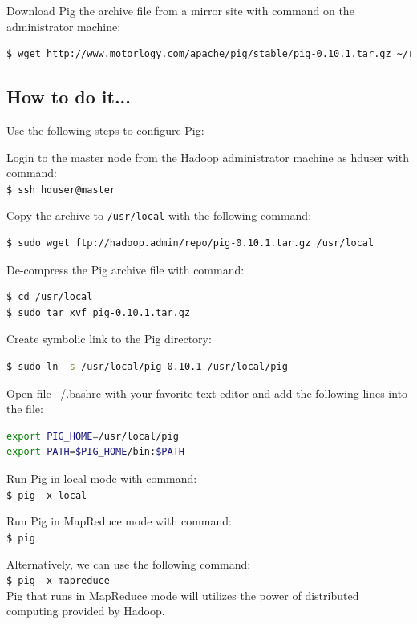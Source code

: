 Download Pig the archive file from a mirror site with command on the administrator machine:
\lstset{style=bashstyle}
\begin{lstlisting}[language=bash]
$ wget http://www.motorlogy.com/apache/pig/stable/pig-0.10.1.tar.gz ~/repo
\end{lstlisting}

\subsection*{How to do it...}
Use the following steps to configure Pig:

Login to the master node from the Hadoop administrator machine as hduser with command: \\
\verb|$ ssh hduser@master|

Copy the archive to \verb|/usr/local| with the following command: 
\lstset{style=bashstyle}
\begin{lstlisting}[language=bash]
$ sudo wget ftp://hadoop.admin/repo/pig-0.10.1.tar.gz /usr/local
\end{lstlisting}

De-compress the Pig archive file with command:
\lstset{style=bashstyle}
\begin{lstlisting}[language=bash]
$ cd /usr/local
$ sudo tar xvf pig-0.10.1.tar.gz
\end{lstlisting}

Create symbolic link to the Pig directory:
\lstset{style=bashstyle}
\begin{lstlisting}[language=bash]
$ sudo ln -s /usr/local/pig-0.10.1 /usr/local/pig
\end{lstlisting}

Open file ~/.bashrc with your favorite text editor and add the following lines into the file:
\lstset{style=bashstyle}
\begin{lstlisting}[language=bash]
export PIG_HOME=/usr/local/pig
export PATH=$PIG_HOME/bin:$PATH
\end{lstlisting}

Run Pig in local mode with command: \\
\verb|$ pig -x local|

Run Pig in MapReduce mode with command: \\
\verb|$ pig|

Alternatively, we can use the following command: \\
\verb|$ pig -x mapreduce| \\
Pig that runs in MapReduce mode will utilizes the power of distributed computing provided by Hadoop.

